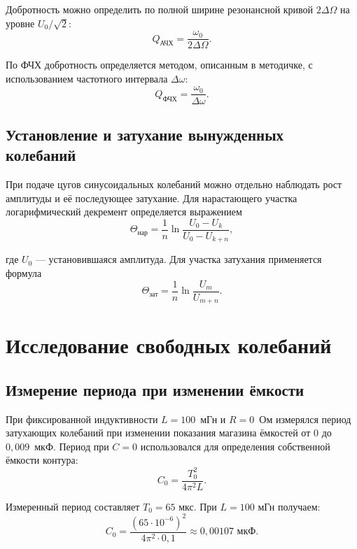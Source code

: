 \documentclass[a4paper,14pt]{extarticle}
\begin{document}
Добротность можно определить по полной ширине резонансной
кривой $2\Delta\Omega$ на уровне $U_0/\sqrt{2}$:
\begin{equation}
  Q_\text{АЧХ}=\frac{\omega_0}{2\Delta\Omega}.
\end{equation}

По ФЧХ добротность определяется методом, описанным в методичке,
с использованием частотного интервала $\Delta\omega$:
\begin{equation}
  Q_\text{ФЧХ}=\frac{\omega_0}{\Delta\omega}.
\end{equation}


\subsection{Установление и затухание вынужденных колебаний}
При подаче цугов синусоидальных колебаний можно отдельно наблюдать
рост амплитуды и её последующее затухание. Для нарастающего участка
логарифмический декремент определяется выражением
\begin{equation}
  \Theta_\text{нар}=\frac{1}{n}
  \ln\frac{U_0-U_k}{U_0-U_{k+n}},
\end{equation}

где $U_0$ --- установившаяся амплитуда.
Для участка затухания применяется формула
\begin{equation}
  \Theta_\text{зат}=\frac{1}{n}\ln\frac{U_m}{U_{m+n}}.
\end{equation}


\section{Исследование свободных колебаний}

\subsection{Измерение периода при изменении ёмкости}
При фиксированной индуктивности $L=100$~мГн и $R=0$~Ом
измерялся период затухающих колебаний при изменении показания
магазина ёмкостей от $0$ до $0{,}009$~мкФ.
Период при $C=0$ использовался для определения
собственной ёмкости контура:
\begin{equation}
    C_0 = \frac{T_0^2}{4\pi^2 L}.
\end{equation}

Измеренный период составляет $T_0 = 65$ мкс.
При $L = 100$ мГн получаем:
\begin{equation}
    C_0 = \frac{(65\cdot10^{-6})^2}
    {4\pi^2\cdot0{,}1}
    \approx 0{,}00107\text{ мкФ}.
\end{equation}
\end{document}
